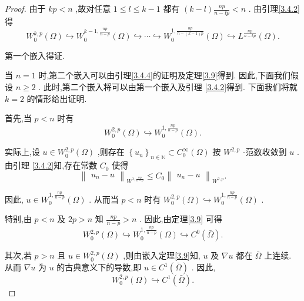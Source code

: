 \documentclass[lang=cn,newtx,10pt,scheme=chinese,thmcnt=chapter]{elegantbook}
\begin{document}
\begin{proof}
    由于 \({kp} < n\) ,故对任意 \(1 \leqslant  l \leqslant  k - 1\) 都有 \(\left( {k - l}\right) \frac{np}{n - {lp}} < n\) . 由引理\ref{3.4.2}得
\begin{equation*}
{W}_{0}^{k,p}\left( \Omega \right)  \hookrightarrow  {W}_{0}^{k - 1,\frac{np}{n - p}}\left( \Omega \right)  \hookrightarrow  \cdots  \hookrightarrow  {W}_{0}^{1,\frac{np}{n - \left( {k - 1}\right) p}}\left( \Omega \right)  \hookrightarrow  {L}^{\frac{np}{n - {kp}}}\left( \Omega \right) .
\end{equation*}

第一个嵌入得证.

当 \(n = 1\) 时,第二个嵌入可以由引理\ref{3.4.4}的证明及定理\ref{3.9}得到. 因此,下面我们假设 \(n \geq  2\) . 此时,第二个嵌入将可以由第一个嵌入及引理 \ref{3.4.2}得到. 下面我们将就 \(k = 2\) 的情形给出证明.

首先,当 \(p < n\) 时有
\begin{equation*}
{W}_{0}^{2,p}\left( \Omega \right)  \hookrightarrow  {W}_{0}^{1,\frac{np}{n - p}}\left( \Omega \right) .
\end{equation*}

实际上,设 \(u \in  {W}_{0}^{2,p}\left( \Omega \right)\) ,则存在 \({\left\{  {u}_{n}\right\}  }_{n \in  \mathbb{N}} \subset  {C}_{0}^{\infty }\left( \Omega \right)\) 按 \({W}^{2,p}\) -范数收敛到 \(u\) . 由引理 \ref{3.4.2}知,存在常数 \({C}_{0}\) 使得
\begin{equation*}
{\begin{Vmatrix}{u}_{n} - u\end{Vmatrix}}_{{W}^{1,\frac{np}{n - p}}} \leqslant  {C}_{0}{\begin{Vmatrix}{u}_{n} - u\end{Vmatrix}}_{{W}^{2,p}}.
\end{equation*}

因此, \(u \in  {W}_{0}^{1,\frac{np}{n - p}}\left( \Omega \right)\) . 从而当 \(p < n\) 时有 \({W}_{0}^{2,p}\left( \Omega \right)  \hookrightarrow  {W}_{0}^{1,\frac{np}{n - p}}\left( \Omega \right)\) .

特别,由 \(p < n\) 及 \({2p} > n\) 知 \(\frac{np}{n - p} > n\) . 因此,由定理\ref{3.9} 可得
\begin{equation*}
{W}_{0}^{2,p}\left( \Omega \right)  \hookrightarrow  {W}_{0}^{1,\frac{np}{n - p}}\left( \Omega \right)  \hookrightarrow  {C}^{0}\left( \bar{\Omega }\right) .
\end{equation*}

其次,若 \(p > n\) 且 \(u \in  {W}_{0}^{2,p}\left( \Omega \right)\) ,则由嵌入定理\ref{3.9}知, \(u\) 及 \(\nabla u\) 都在 \(\bar{\Omega }\) 上连续. 从而 \(\nabla u\) 为 \(u\) 的古典意义下的导数,即 \(u \in  {C}^{1}\left( \bar{\Omega }\right)\) . 因此,
\begin{equation*}
{W}_{0}^{2,p}\left( \Omega \right)  \hookrightarrow  {C}^{1}\left( \bar{\Omega }\right) .
\end{equation*}


\end{proof}
\end{document}
